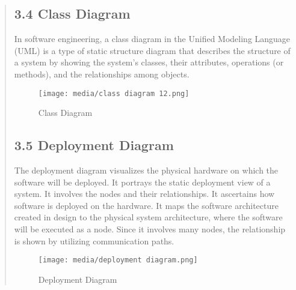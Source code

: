 \documentclass[12pt]{report}
\begin{document}
\begin{quote}
		\subsection{3.4 Class Diagram}
		In software engineering, a class diagram in the Unified Modeling Language (UML) is a type of static structure diagram that describes the structure of a system by showing the system's classes, their attributes, operations (or methods), and the relationships among objects.
		\begin{figure}
			\centering
			\texttt{[image: media/class diagram 12.png]}\\
			\caption{Class Diagram}
		\end{figure}
		\clearpage
		\subsection{3.5 Deployment Diagram}
		The deployment diagram visualizes the physical hardware on which the software will be deployed. It portrays the static deployment view of a system. It involves the nodes and their relationships.
		It ascertains how software is deployed on the hardware. It maps the software architecture created in design to the physical system architecture, where the software will be executed as a node. Since it involves many nodes, the relationship is shown by utilizing communication paths.
		\begin{figure}
			\centering
			\texttt{[image: media/deployment diagram.png]}\\
			\caption{Deployment Diagram}
		\end{figure}
	\end{quote}
	\clearpage
	
\end{document}
